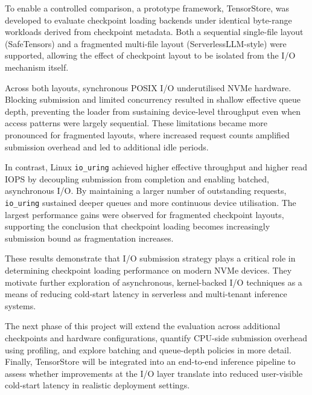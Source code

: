 \documentclass[]{final_report}
\begin{document}
To enable a controlled comparison, a prototype framework, TensorStore, was developed to evaluate checkpoint loading backends under identical byte-range workloads derived from checkpoint metadata. Both a sequential single-file layout (SafeTensors) and a fragmented multi-file layout (ServerlessLLM-style) were supported, allowing the effect of checkpoint layout to be isolated from the I/O mechanism itself.

Across both layouts, synchronous POSIX I/O underutilised NVMe hardware. Blocking submission and limited concurrency resulted in shallow effective queue depth, preventing the loader from sustaining device-level throughput even when access patterns were largely sequential. These limitations became more pronounced for fragmented layouts, where increased request counts amplified submission overhead and led to additional idle periods.

In contrast, Linux \texttt{io\_uring} achieved higher effective throughput and higher read IOPS by decoupling submission from completion and enabling batched, asynchronous I/O. By maintaining a larger number of outstanding requests, \texttt{io\_uring} sustained deeper queues and more continuous device utilisation. The largest performance gains were observed for fragmented checkpoint layouts, supporting the conclusion that checkpoint loading becomes increasingly submission bound as fragmentation increases.

These results demonstrate that I/O submission strategy plays a critical role in determining checkpoint loading performance on modern NVMe devices. They motivate further exploration of asynchronous, kernel-backed I/O techniques as a means of reducing cold-start latency in serverless and multi-tenant inference systems.

The next phase of this project will extend the evaluation across additional checkpoints and hardware configurations, quantify CPU-side submission overhead using profiling, and explore batching and queue-depth policies in more detail. Finally, TensorStore will be integrated into an end-to-end inference pipeline to assess whether improvements at the I/O layer translate into reduced user-visible cold-start latency in realistic deployment settings.



\newpage

\end{document}
